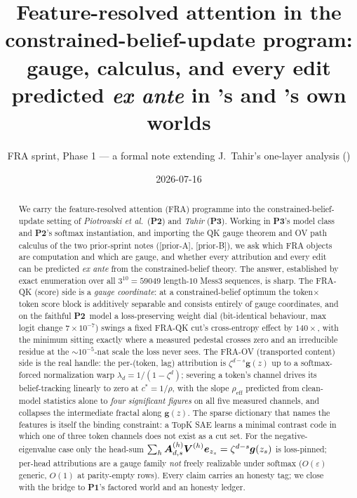 \documentclass{article}
\title{Feature-resolved attention in the constrained-belief-update program:\\
gauge, calculus, and every edit predicted \emph{ex ante} in \Ptwo's and \Pone's own worlds}
\author{FRA sprint, Phase 1 --- a formal note extending J.\ Tahir's one-layer analysis (\Pthree)}
\date{2026-07-16}
\newcommand{\gb}{\boldsymbol{g}}
\newcommand{\Pone}{\textbf{P1}}
\newcommand{\Ptwo}{\textbf{P2}}
\newcommand{\Pthree}{\textbf{P3}}
\newcommand{\priorA}{\textsf{[prior-A]}}
\newcommand{\priorB}{\textsf{[prior-B]}}
\begin{document}
\maketitle

\begin{abstract}
We carry the feature-resolved attention (FRA) programme into the
constrained-belief-update setting of \emph{Piotrowski et al.}\ (\Ptwo) and
\emph{Tahir} (\Pthree). Working in \Pthree's model class and \Ptwo's softmax
instantiation, and importing the QK gauge theorem and OV path calculus of the two
prior-sprint notes (\priorA, \priorB), we ask which FRA objects are computation
and which are gauge, and whether every attribution and every edit can be predicted
\emph{ex ante} from the constrained-belief theory. The answer, established by
exact enumeration over all $3^{10}=59049$ length-$10$ Mess3 sequences, is sharp.
The FRA-QK (score) side is a \emph{gauge coordinate}: at a constrained-belief
optimum the token$\times$token score block is additively separable and consists
entirely of gauge coordinates, and on the faithful \Ptwo\ model a loss-preserving
weight dial (bit-identical behaviour, max logit change $7\!\times\!10^{-7}$) swings
a fixed FRA-QK cut's cross-entropy effect by $140\times$, with the minimum sitting
exactly where a measured pedestal crosses zero and an irreducible residue at the
$\sim\!10^{-5}$-nat scale the loss never sees. The FRA-OV (transported content)
side is the real handle: the per-(token, lag) attribution is $\zeta^{d-s}\gb(z)$ up
to a softmax-forced normalization warp $\lambda_d=1/(1-\zeta^d)$; severing a
token's channel drives its belief-tracking linearly to zero at $c^\ast=1/\rho$,
with the slope $\rho_{\mathrm{eff}}$ predicted from clean-model statistics alone to
\emph{four significant figures} on all five measured channels, and collapses the
intermediate fractal along $\gb(z)$. The sparse dictionary that names the features
is itself the binding constraint: a TopK SAE learns a minimal contrast code in
which one of three token channels does not exist as a cut set. For the
negative-eigenvalue case only the head-sum
$\sum_h\Ab^{(h)}_{d,s}\Vb^{(h)}\eb_{z_s}=\zeta^{d-s}\gb(z_s)$ is loss-pinned;
per-head attributions are a gauge family \emph{not} freely realizable under softmax
($O(\varepsilon)$ generic, $O(1)$ at parity-empty rows). Every claim carries an
honesty tag; we close with the bridge to \Pone's factored world and an honesty
ledger.
\end{abstract}

\tableofcontents
\end{document}
